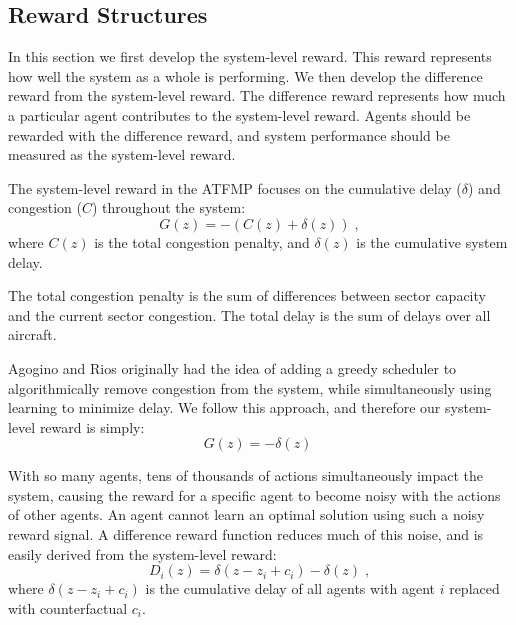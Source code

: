 \documentclass[letterpaper]{article}
\begin{document}
 

\subsection{Reward Structures}

In this section we first develop the system-level reward. This reward represents how well the system as a whole is performing. We then develop the difference reward from the system-level reward. The difference reward represents how much a particular agent contributes to the system-level reward. Agents should be rewarded with the difference reward, and system performance should be measured as the system-level reward. 

The system-level reward in the ATFMP focuses on the cumulative delay ($\delta$) and congestion ($C$) throughout the system:
%
\begin{equation} \label{eq:Global}
G(z) = -(C(z) + \delta(z))\;,
\end{equation}
%
where $C(z)$ is the total congestion penalty, and $\delta(z)$ is the cumulative system delay.

The total congestion penalty is the sum of differences between sector capacity and the current sector congestion. The total delay is the sum of delays over all aircraft.

Agogino and Rios originally had the idea of adding a greedy scheduler to algorithmically remove congestion from the system, while simultaneously using learning to minimize delay. We follow this approach, and therefore our system-level reward is simply:
%
\begin{equation} \label{eq:Global}
G(z) = -\delta(z)\;
\end{equation}
%

With so many agents, tens of thousands of actions simultaneously impact the system, causing the reward for a specific agent to become noisy with the actions of other agents. An agent cannot learn an optimal solution using such a noisy reward signal. A difference reward function reduces much of this noise, and is easily derived from the system-level reward:
%
\begin{equation}
D_i(z) = \delta(z-z_i + c_i) - \delta(z)\;,
\end{equation}
%
where \textit{$\delta(z-z_i + c_i)$} is the cumulative delay of all agents with agent $i$ replaced with counterfactual \textit{$c_i$}.
\end{document}
